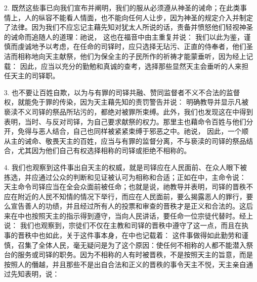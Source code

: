 2. 既然这些事已向我们宣布并阐明，我们的服从必须遵从神圣的诫命；在此类事情上，人的纵容不能看人情面，也不能向任何人让步，因为神圣的规定介入并制定了法律。因为我们不应忘记主藉先知对犹太人所说的话，责备并愤怒他们轻视神圣的诫命而追随人的道理：祂说，  这也在福音中由主重复并说：  我们以此为鉴，谨慎而虔诚地予以考虑，在任命的司铎时，应只选择无玷污、正直的侍奉者，他们圣洁而相称地向天主献祭，他们为保全主的子民所作的祈祷才能蒙垂听，因为经上记载：  因此，应当以充分的勤勉和真诚的查考，选择那些显然天主会垂听的人来担任天主的司铎职。\par

3. 也不要让百姓自欺，以为与有罪的司铎共融、赞同监督者不义不合法的监督权，就能免于罪的传染，因为天主藉先知的责罚警告并说：  明确教导并显示凡被亵渎不义司铎的祭品所玷污的，都绝对被罪所束缚。此外，我们也发现这在中得到表明，当时、与反对司铎，为自己要求献祭的权力。那里主也藉命令百姓与他们分开，免得与恶人结合，自己也同样被紧紧束缚于邪恶之中。祂说，  因此，一个顺从主的诫命、敬畏天主的百姓，应当与有罪的监督分离，不与亵渎的司铎的祭品结合，尤其因为他们自己有权选择相称的司铎或拒绝不相称的。\par

4. 我们也观察到这件事出自天主的权威，就是司铎应在人民面前、在众人眼下被拣选，并应通过公众的判断和见证被认可为相称和合适；正如在中，主命令说： 天主命令司铎应当在全会众面前被任命；也就是说，祂教导并表明，司铎的晋秩不应在附近的人民不知情的情况下举行，而应在人民面前，要么揭露恶人的罪行，要么宣告善人的功绩，并且经过所有人的投票和审查的晋秩才是正义和合法的。这后来在中也按照天主的指示得到遵守，当向人民讲话，要任命一位宗徒代替时。经上说： 我们也观察到，宗徒们不仅在主教和司铎的晋秩中遵守了这一点，而且在执事的晋秩中也如此，关于这件事本身，在中也记载着： 这件事做得如此勤劳和谨慎，召集了全体人民，毫无疑问是为了这个原因：使任何不相称的人都不能潜入祭台的服务或司铎的职务。因为不相称的人有时被晋秩，不是按照天主的旨意，而是按照人的僭越，并且那些不是出自合法和正义的晋秩的事令天主不悦，天主亲自通过先知表明，说：\par


